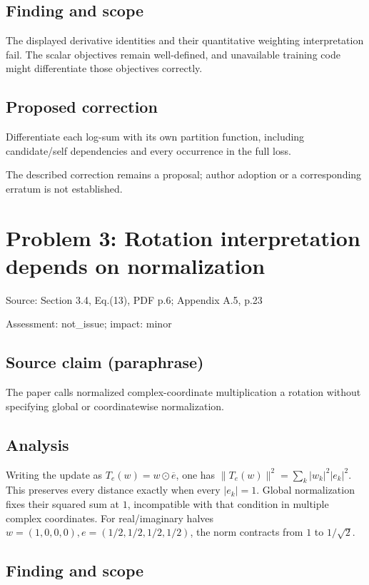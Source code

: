 \documentclass[11pt]{article}
\begin{document}
\subsection*{Finding and scope}

The displayed derivative identities and their quantitative weighting interpretation fail. The scalar objectives remain well-defined, and unavailable training code might differentiate those objectives correctly.

\subsection*{Proposed correction}

Differentiate each log-sum with its own partition function, including candidate/self dependencies and every occurrence in the full loss.

The described correction remains a proposal; author adoption or a corresponding erratum is not established.

\section*{Problem 3: Rotation interpretation depends on normalization}

Source: Section 3.4, Eq.(13), PDF p.6; Appendix A.5, p.23

Assessment: not\_issue; impact: minor

\subsection*{Source claim (paraphrase)}

The paper calls normalized complex-coordinate multiplication a rotation without specifying global or coordinatewise normalization.

\subsection*{Analysis}

Writing the update as \(T_e(w)=w\odot\overline e\), one has \(\|T_e(w)\|^2=\sum_k|w_k|^2|e_k|^2\). This preserves every distance exactly when every \(|e_k|=1\). Global normalization fixes their squared sum at \(1\), incompatible with that condition in multiple complex coordinates. For real/imaginary halves \(w=(1,0,0,0),e=(1/2,1/2,1/2,1/2)\), the norm contracts from \(1\) to \(1/\sqrt2\).

\subsection*{Finding and scope}
\end{document}
